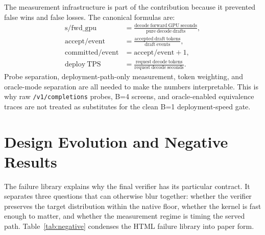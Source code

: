 \documentclass[conference]{IEEEtran}
\newcommand{\code}[1]{\texttt{#1}}
\begin{document}
The measurement infrastructure is part of the contribution because it prevented false wins and false losses. The canonical formulas are:
\begin{align}
\mathrm{s/fwd\_gpu} &= \frac{\mathrm{decode\ forward\ GPU\ seconds}}{\mathrm{pure\ decode\ drafts}}, \\
\mathrm{accept/event} &= \frac{\mathrm{accepted\ draft\ tokens}}{\mathrm{draft\ events}}, \\
\mathrm{committed/event} &= \mathrm{accept/event}+1, \\
\mathrm{deploy\ TPS} &= \frac{\mathrm{request\ decode\ tokens}}{\mathrm{request\ decode\ seconds}}.
\end{align}
Probe separation, deployment-path-only measurement, token weighting, and oracle-mode separation are all needed to make the numbers interpretable. This is why raw \code{/v1/completions} probes, B=4 screens, and oracle-enabled equivalence traces are not treated as substitutes for the clean B=1 deployment-speed gate.

\section{Design Evolution and Negative Results}

The failure library explains why the final verifier has its particular contract. It separates three questions that can otherwise blur together: whether the verifier preserves the target distribution within the native floor, whether the kernel is fast enough to matter, and whether the measurement regime is timing the served path. Table~\ref{tab:negative} condenses the HTML failure library into paper form.
\end{document}
